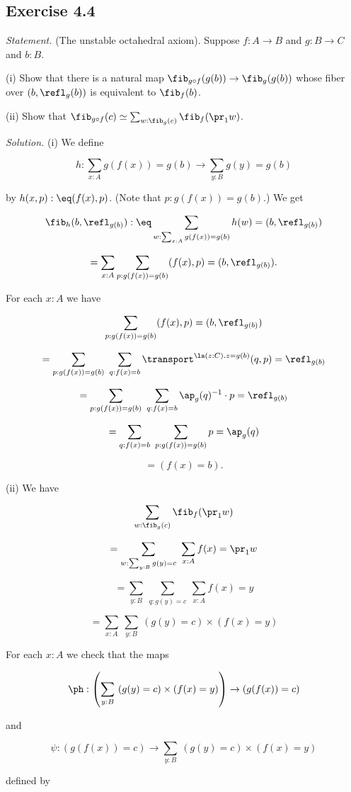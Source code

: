\documentclass[12pt]{article}
\begin{document}

\subsection{Exercise 4.4}

\emph{Statement.} (The unstable octahedral axiom). Suppose $f:A\to B$ and $g:B\to C$ and $b:B$.

\nn(i) Show that there is a natural map $\fib_{g\circ f}(g(b))\to\fib_g(g(b))$ whose fiber over $(b, \refl_g(b) )$ is equivalent to $\fib_f(b)$.

\nn(ii) Show that $\fib_{g\circ f}(c)\simeq\sum_{w:\fib_g(c)}\fib_f(\pr_1w)$.

\nn\emph{Solution.} (i) We define 

$$h:\sum_{x:A}g(f(x))=g(b)\to\sum_{y:B}g(y)=g(b)$$ 

\nn by $h(x,p):\eq(f(x),p)$. (Note that $p:g(f(x))=g(b)$.) We get 

$$\fib_h(b,\refl_{g(b)}):\eq\sum_{w:\sum_{x:A}g(f(x))=g(b)}h(w)=(b,\refl_{g(b)})$$ 

$$=\sum_{x:A}\sum_{p:g(f(x))=g(b)}(f(x),p)=(b,\refl_{g(b)}).$$ 

\nn For each $x:A$ we have

$$\sum_{p:g(f(x))=g(b)}(f(x),p)=(b,\refl_{g(b)})$$ 

$$=\sum_{p:g(f(x))=g(b)}\ \sum_{q:f(x)=b}\transport^{\la(z:C).z=g(b)}(q,p)=\refl_{g(b)}$$ 

$$=\sum_{p:g(f(x))=g(b)}\ \sum_{q:f(x)=b}\ap_g(q)^{-1}\cdot p=\refl_{g(b)}$$ 

$$=\sum_{q:f(x)=b}\ \sum_{p:g(f(x))=g(b)}p=\ap_g(q)$$ 

$$=(f(x)=b).$$ 

\nn(ii) We have 

$$\sum_{w:\fib_g(c)}\fib_f(\pr_1w)$$ 

$$=\sum_{w:\sum_{y:B}g(y)=c}\ \sum_{x:A}f(x)=\pr_1w$$ 

$$=\sum_{y:B}\ \sum_{q:g(y)=c}\ \sum_{x:A}f(x)=y$$ 

$$=\sum_{x:A}\ \sum_{y:B}\ (g(y)=c)\times(f(x)=y)$$ 

\nn For each $x:A$ we check that the maps 

$$\ph:\left(\sum_{y:B}\ (g(y)=c)\times(f(x)=y)\right)\to(g(f(x))=c)$$ 

\nn and 

$$\psi:(g(f(x))=c)\to\sum_{y:B}\ (g(y)=c)\times(f(x)=y)$$ 

\nn defined by 
\end{document}

